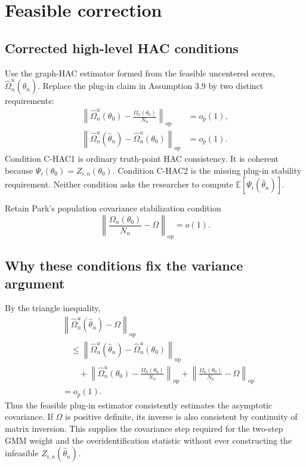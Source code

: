 \documentclass[11pt]{article}
\newcommand{\E}{\mathbb E}
\newcommand{\op}{\mathrm{op}}
\begin{document}
\section{Feasible correction}

\subsection{Corrected high-level HAC conditions}

Use the graph-HAC estimator formed from the feasible uncentered scores,
\(\widehat\Omega_n^u(\widehat\theta_n)\). Replace the plug-in claim in
Assumption 3.9 by two distinct requirements:
\begin{align}
 \left\|
   \widehat\Omega_n^u(\theta_0)
   -\frac{\Omega_n(\theta_0)}{N_n}
 \right\|_{\op}
 &=o_p(1),
 \tag{C-HAC1}\label{eq:hac-truth}\\
 \left\|
   \widehat\Omega_n^u(\widehat\theta_n)
   -\widehat\Omega_n^u(\theta_0)
 \right\|_{\op}
 &=o_p(1).
 \tag{C-HAC2}\label{eq:hac-plugin}
\end{align}
Condition C-HAC1 is ordinary truth-point HAC consistency. It is coherent
because \(\Psi_i(\theta_0)=Z_{i,n}(\theta_0)\). Condition C-HAC2 is the missing
plug-in stability requirement. Neither condition asks the researcher to
compute \(\E[\Psi_i(\widehat\theta_n)]\).

Retain Park's population covariance stabilization condition
\begin{equation}
 \left\|
   \frac{\Omega_n(\theta_0)}{N_n}-\Omega
 \right\|_{\op}=o(1).
 \tag{C-HAC3}\label{eq:hac-population}
\end{equation}

\subsection{Why these conditions fix the variance argument}

By the triangle inequality,
\begin{align}
 &\left\|
   \widehat\Omega_n^u(\widehat\theta_n)-\Omega
  \right\|_{\op} \\
 &\quad\le
 \left\|
   \widehat\Omega_n^u(\widehat\theta_n)
   -\widehat\Omega_n^u(\theta_0)
 \right\|_{\op} \\
 &\qquad+
 \left\|
   \widehat\Omega_n^u(\theta_0)
   -\frac{\Omega_n(\theta_0)}{N_n}
 \right\|_{\op}
 +\left\|
   \frac{\Omega_n(\theta_0)}{N_n}-\Omega
 \right\|_{\op} \\
 &=o_p(1).
 \label{eq:hac-triangle}
\end{align}
Thus the feasible plug-in estimator consistently estimates the asymptotic
covariance. If \(\Omega\) is positive definite, its inverse is also consistent
by continuity of matrix inversion. This supplies the covariance step required
for the two-step GMM weight and the overidentification statistic without ever
constructing the infeasible \(Z_{i,n}(\widehat\theta_n)\).
\end{document}
